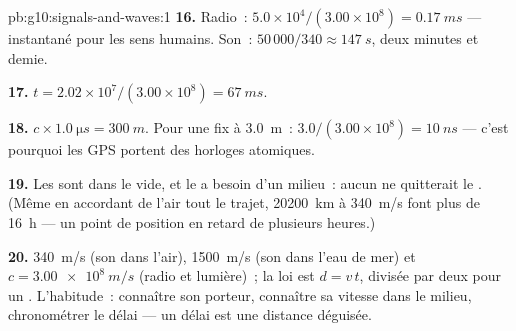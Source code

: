 \begin{solution}{pb:g10:signals-and-waves:1}
\textbf{16.} Radio~: $5.0\times10^{4}/(3.00\times10^{8}) =
\qty{0.17}{ms}$ --- instantané pour les sens humains.
Son~: $50\,000/340 \approx \qty{147}{s}$, deux minutes et demie.

\textbf{17.} $t = 2.02\times10^{7}/(3.00\times10^{8}) = \qty{67}{ms}$.

\textbf{18.} $c \times \qty{1.0}{\micro s} = \qty{300}{m}$. Pour une
fix à \qty{3.0}{m}~: $3.0/(3.00\times10^{8}) = \qty{10}{ns}$ ---
c'est pourquoi les  GPS portent des horloges
atomiques.

\textbf{19.} Les  sont dans le vide, et le
 a besoin d'un milieu~: aucun 
ne quitterait le . (Même en accordant de
l'air tout le trajet, \qty{20200}{km} à \qty{340}{m/s} font plus de
\qty{16}{h} --- un point de position en retard de plusieurs heures.)

\textbf{20.} \qty{340}{m/s} (son dans l'air),
\qty{1500}{m/s} (son dans l'eau de mer) et
$c = \qty{3.00e8}{m/s}$ (radio et lumière)~; la loi est $d = v\,t$,
divisée par deux pour un . L'habitude~: connaître
son porteur, connaître sa vitesse dans le milieu, chronométrer le
délai --- un délai est une distance déguisée.
\end{solution}
